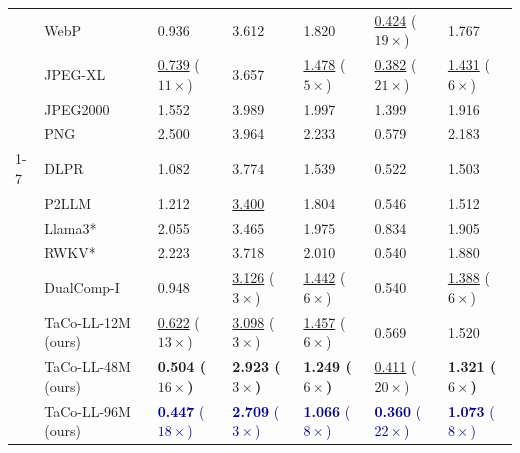\begin{table}[tb]
\begin{tabular}{p{0.24cm}p{4cm}|lllll}
    & WebP \citep{webp}   & 0.936 & 3.612 & 1.820 &  \underline{0.424} ($19\times$) & 1.767\\
    & JPEG-XL \citep{jpegxl}    & \underline{0.739} ($11\times$) & 3.657 & \underline{1.478} ($5\times$) & \underline{0.382} ($21\times$) & \underline{1.431} ($6\times$)\\
    & JPEG2000 \citep{jpeg2000} & 1.552 & 3.989 & 1.997 & 1.399 & 1.916\\
    & PNG \citep{png}    & 2.500 & 3.964 & 2.233 & 0.579 & 2.183\\
    \cmidrule{1-7}
    \multirow{8.3}{*}{\rotatebox{90}{\textbf{Neural}}}
    & DLPR \citep{dlpr} & 1.082 & 3.774 & 1.539 & 0.522 & 1.503\\
    & P2LLM \citep{p2llm}  & 1.212 & \underline{3.400} & 1.804 &  0.546 & 1.512\\
    & Llama3* \citep{lmic} & 2.055 & 3.465 & 1.975 &  0.834 & 1.905\\
    & RWKV* \citep{lmic}   & 2.223 & 3.718 & 2.010 &  0.540 & 1.880\\
    & DualComp-I \citep{dualcomp} & 0.948 & \underline{3.126} ($3\times$) & \underline{1.442} ($6\times$) & 0.540 & \underline{1.388} ($6\times$)\\
    & \cellcolor{lightpink}TaCo-LL-12M (ours)
    & \cellcolor{lightpink}\underline{0.622} ($13\times$)
    & \cellcolor{lightpink}\underline{3.098} ($3\times$)
    & \cellcolor{lightpink}\underline{1.457} ($6\times$)
    & \cellcolor{lightpink}0.569
    & \cellcolor{lightpink}1.520\\

    & \cellcolor{lightpink}TaCo-LL-48M (ours)
    & \cellcolor{lightpink}\textbf{0.504 ($16\times$)}
    & \cellcolor{lightpink}\textbf{2.923 ($3\times$)}
    & \cellcolor{lightpink}\textbf{1.249 ($6\times$)}
    & \cellcolor{lightpink}\underline{0.411} ($20\times$)
    & \cellcolor{lightpink}\textbf{1.321 ($6\times$)}\\

    & \cellcolor{lightpink}TaCo-LL-96M (ours)
    & \cellcolor{lightpink}\textcolor{darkblue}{\textbf{0.447} ($18\times$)}
    & \cellcolor{lightpink}\textcolor{darkblue}{\textbf{2.709} ($3\times$)}
    & \cellcolor{lightpink}\textcolor{darkblue}{\textbf{1.066} ($8\times$)}
    & \cellcolor{lightpink}\textcolor{darkblue}{\textbf{0.360} ($22\times$)}
    & \cellcolor{lightpink}\textcolor{darkblue}{\textbf{1.073} ($8\times$)}\\
    \bottomrule
    \end{tabular}
    \label{tab:compare-lossless-rd}
\end{table}

